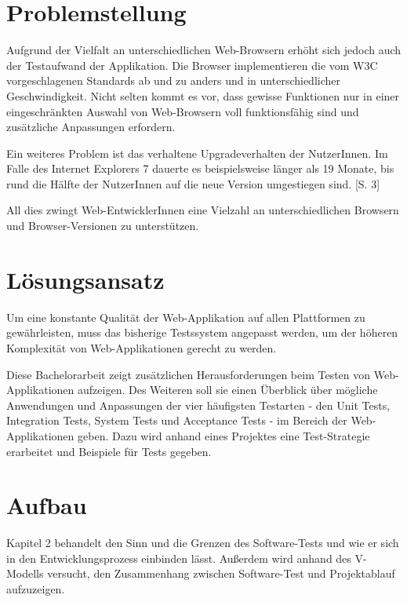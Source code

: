 \documentclass[a4paper,bibtotoc,oneside]{scrbook}
\begin{document}
\section{Problemstellung}
Aufgrund der Vielfalt an unterschiedlichen Web-Browsern erhöht sich jedoch auch der Testaufwand der Applikation. Die Browser implementieren die vom W3C vorgeschlagenen Standards ab und zu anders und in unterschiedlicher Geschwindigkeit. Nicht selten kommt es vor, dass gewisse Funktionen nur in einer eingeschränkten Auswahl von Web-Browsern voll funktionsfähig sind und zusätzliche Anpassungen erfordern. \cite{caniuse}

Ein weiteres Problem ist das verhaltene Upgradeverhalten der NutzerInnen. Im Falle des Internet Explorers 7 dauerte es beispielsweise länger als 19 Monate, bis rund die Hälfte der NutzerInnen auf die neue Version umgestiegen sind. \cite{insecure}[S. 3]

All dies zwingt Web-EntwicklerInnen eine Vielzahl an unterschiedlichen Browsern und Browser-Versionen zu unterstützen.


\section{Lösungsansatz}
Um eine konstante Qualität der Web-Applikation auf allen Plattformen zu gewährleisten, muss das bisherige Testssystem angepasst werden, um der höheren Komplexität von Web-Applikationen gerecht zu werden. 

Diese Bachelorarbeit zeigt zusätzlichen Herausforderungen beim Testen von Web-Applikationen aufzeigen. Des Weiteren soll sie einen Überblick über mögliche Anwendungen und Anpassungen der vier häufigsten Testarten - den Unit Tests, Integration Tests, System Tests und Acceptance Tests - im Bereich der Web-Applikationen geben. Dazu wird anhand eines Projektes eine Test-Strategie erarbeitet und Beispiele für Tests gegeben.

\newpage

\section{Aufbau}
Kapitel 2 behandelt den Sinn und die Grenzen des Software-Tests und wie er sich in den Entwicklungsprozess einbinden lässt. Außerdem wird anhand des V-Modells versucht, den Zusammenhang zwischen Software-Test und Projektablauf aufzuzeigen.
\end{document}
